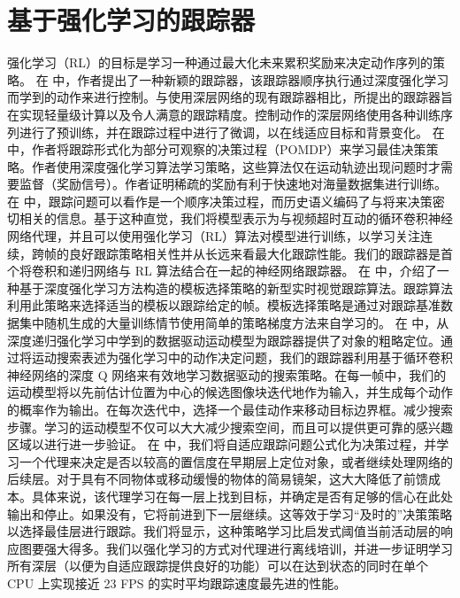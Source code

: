 \section{基于强化学习的跟踪器}
强化学习（RL）的目标是学习一种通过最大化未来累积奖励来决定动作序列的策略。
在 \cite{yun2017action} 中，作者提出了一种新颖的跟踪器，该跟踪器顺序执行通过深度强化学习而学到的动作来进行控制。与使用深层网络的现有跟踪器相比，所提出的跟踪器旨在实现轻量级计算以及令人满意的跟踪精度。控制动作的深层网络使用各种训练序列进行了预训练，并在跟踪过程中进行了微调，以在线适应目标和背景变化。 %
在 \cite{supancic2017tracking} 中，作者将跟踪形式化为部分可观察的决策过程（POMDP）来学习最佳决策策略。作者使用深度强化学习算法学习策略，这些算法仅在运动轨迹出现问题时才需要监督（奖励信号）。作者证明稀疏的奖励有利于快速地对海量数据集进行训练。 %
在 \cite{DeepReinforcement} 中，跟踪问题可以看作是一个顺序决策过程，而历史语义编码了与将来决策密切相关的信息。基于这种直觉，我们将模型表示为与视频超时互动的循环卷积神经网络代理，并且可以使用强化学习（RL）算法对模型进行训练，以学习关注连续，跨帧的良好跟踪策略相关性并从长远来看最大化跟踪性能。我们的跟踪器是首个将卷积和递归网络与 RL 算法结合在一起的神经网络跟踪器。%
在 \cite{RealTimeVisual} 中，介绍了一种基于深度强化学习方法构造的模板选择策略的新型实时视觉跟踪算法。跟踪算法利用此策略来选择适当的模板以跟踪给定的帧。模板选择策略是通过对跟踪基准数据集中随机生成的大量训练情节使用简单的策略梯度方法来自学习的。%
在 \cite{HierarchicalTracking} 中，从深度递归强化学习中学到的数据驱动运动模型为跟踪器提供了对象的粗略定位。通过将运动搜索表述为强化学习中的动作决定问题，我们的跟踪器利用基于循环卷积神经网络的深度 Q 网络来有效地学习数据驱动的搜索策略。在每一帧中，我们的运动模型将以先前估计位置为中心的候选图像块迭代地作为输入，并生成每个动作的概率作为输出。在每次迭代中，选择一个最佳动作来移动目标边界框。减少搜索步骤。学习的运动模型不仅可以大大减少搜索空间，而且可以提供更可靠的感兴趣区域以进行进一步验证。%
在 \cite{LearningPolicies} 中，我们将自适应跟踪问题公式化为决策过程，并学习一个代理来决定是否以较高的置信度在早期层上定位对象，或者继续处理网络的后续层。对于具有不同物体或移动缓慢的物体的简易镜架，这大大降低了前馈成本。具体来说，该代理学习在每一层上找到目标，并确定是否有足够的信心在此处输出和停止。如果没有，它将前进到下一层继续。这等效于学习“及时的”决策策略以选择最佳层进行跟踪。我们将显示，这种策略学习比启发式阈值当前活动层的响应图要强大得多。我们以强化学习的方式对代理进行离线培训，并进一步证明学习所有深层（以便为自适应跟踪提供良好的功能）可以在达到状态的同时在单个 CPU 上实现接近 23 FPS 的实时平均跟踪速度最先进的性能。%
